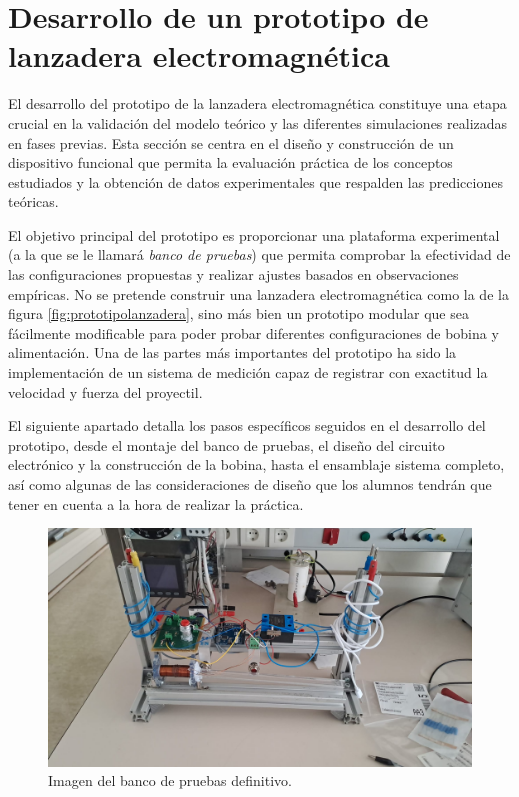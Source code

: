 \section{Desarrollo de un prototipo de lanzadera electromagnética}
\label{sec:prototipo}

El desarrollo del prototipo de la lanzadera electromagnética constituye una etapa crucial en la validación del modelo teórico y las diferentes simulaciones realizadas en fases previas. Esta sección se centra en el diseño y construcción de un dispositivo funcional que permita la evaluación práctica de los conceptos estudiados y la obtención de datos experimentales que respalden las predicciones teóricas.

El objetivo principal del prototipo es proporcionar una plataforma experimental (a la que se le llamará \textit{banco de pruebas}) que permita comprobar la efectividad de las configuraciones propuestas y realizar ajustes basados en observaciones empíricas. No se pretende construir una lanzadera electromagnética como la de la figura \ref{fig:prototipolanzadera}, sino más bien un prototipo modular que sea fácilmente modificable para poder probar diferentes configuraciones de bobina y alimentación. Una de las partes más importantes del prototipo ha sido la implementación de un sistema de medición capaz de registrar con exactitud la velocidad y fuerza del proyectil.

El siguiente apartado detalla los pasos específicos seguidos en el desarrollo del prototipo, desde el montaje del banco de pruebas, el diseño del circuito electrónico y la construcción de la bobina, hasta el ensamblaje sistema completo, así como algunas de las consideraciones de diseño que los alumnos tendrán que tener en cuenta a la hora de realizar la práctica.

\begin{figure}[H]
    \centering
    \includegraphics[width=\textwidth]{FigurasMemoria/prototipoFinal.jpeg}
    \caption{Imagen del banco de pruebas definitivo.}
    \label{fig:prototipoFinal} %
\end{figure}

